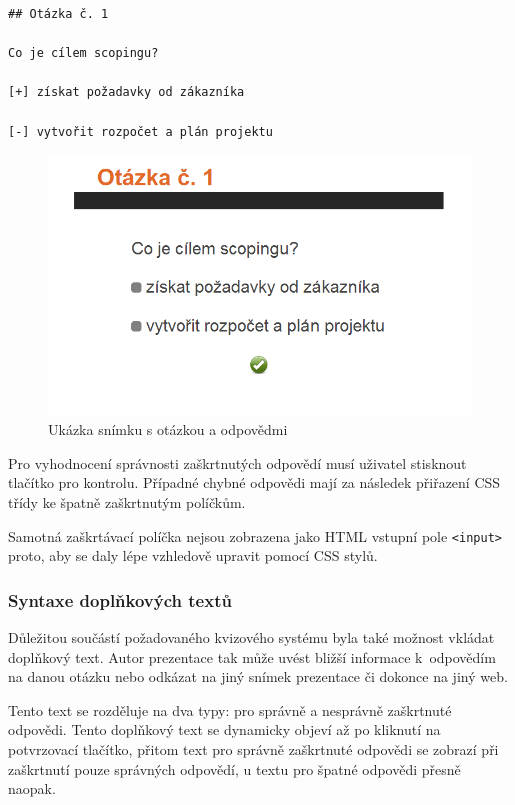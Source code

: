 \documentclass[11pt,twoside,a4paper]{book}
\begin{document}
\begin{lstlisting}[caption={Ukázka zdrojového textu snímku s otázkou a odpovědmi},label={lst:odpovedi}]
## Otázka č. 1

Co je cílem scopingu?

[+] získat požadavky od zákazníka

[-] vytvořit rozpočet a plán projektu
\end{lstlisting}


\begin{figure}[ht]
	\begin{center}
		\includegraphics[width=14cm]{PRO-img/odpovedi.png}
		\caption{Ukázka snímku s otázkou a odpovědmi}
		\label{fig:odpovedi}
	\end{center}
\end{figure}

Pro vyhodnocení správnosti zaškrtnutých odpovědí musí uživatel stisknout tlačítko pro kontrolu. Případné chybné odpovědi mají za následek přiřazení CSS třídy ke špatně zaškrtnutým políčkům.

Samotná zaškrtávací políčka nejsou zobrazena jako HTML vstupní pole \verb|<input>| proto, aby se daly lépe vzhledově upravit pomocí CSS stylů.

\subsubsection{Syntaxe doplňkových textů}
Důležitou součástí požadovaného kvizového systému byla také možnost vkládat doplňkový text. Autor prezentace tak může uvést bližší informace k~odpovědím na danou otázku nebo odkázat na jiný snímek prezentace či dokonce na jiný web.

Tento text se rozděluje na dva typy: pro správně a nesprávně zaškrtnuté odpovědi. Tento doplňkový text se dynamicky objeví až po kliknutí na potvrzovací tlačítko, přitom text pro správně zaškrtnuté odpovědi se zobrazí při zaškrtnutí pouze správných odpovědí, u textu pro špatné odpovědi přesně naopak.
\end{document}
